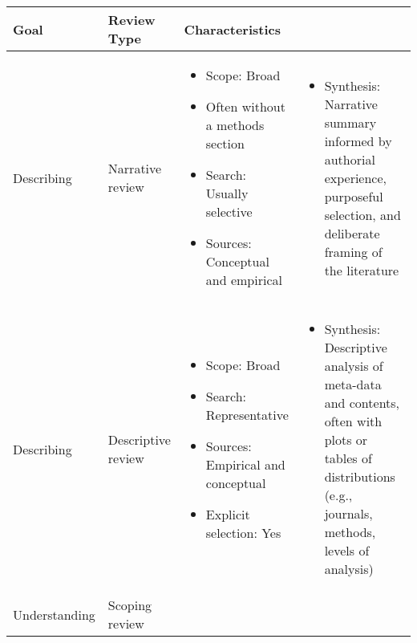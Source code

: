 \documentclass[11pt]{scrartcl}
\theoremstyle{aufgabenstyle}
\begin{document}

\begin{table}[H]
	\centering
	\footnotesize
	\begin{tabularx}{\textwidth}{l p{2.4cm} X X}
		\toprule
		\textbf{Goal} & \textbf{Review Type} & \textbf{Characteristics} & \\
		\midrule
		Describing & Narrative review & 
		\begin{itemize}[leftmargin=*, noitemsep, topsep=0pt]
			\item Scope: Broad
			\item Often without a methods section
			\item Search: Usually selective
			\item Sources: Conceptual and empirical
		\end{itemize} & 
		\begin{itemize}[leftmargin=*, noitemsep, topsep=0pt]
			\item Synthesis: Narrative summary informed by authorial experience, purposeful selection, and deliberate framing of the literature
		\end{itemize} \\
		Describing & Descriptive review & 
		\begin{itemize}[leftmargin=*, noitemsep, topsep=0pt]
			\item Scope: Broad
			\item Search: Representative
			\item Sources: Empirical and conceptual
			\item Explicit selection: Yes
		\end{itemize} & 
		\begin{itemize}[leftmargin=*, noitemsep, topsep=0pt]
			\item Synthesis: Descriptive analysis of meta-data and contents, often with plots or tables of distributions (e.g., journals, methods, levels of analysis)
		\end{itemize} \\
		\midrule
		Understanding & Scoping review & 
		\begin{itemize}[leftmargin=*, noitemsep, topsep=0pt]

\end{itemize}
\end{tabularx}
\end{table}
\end{document}
